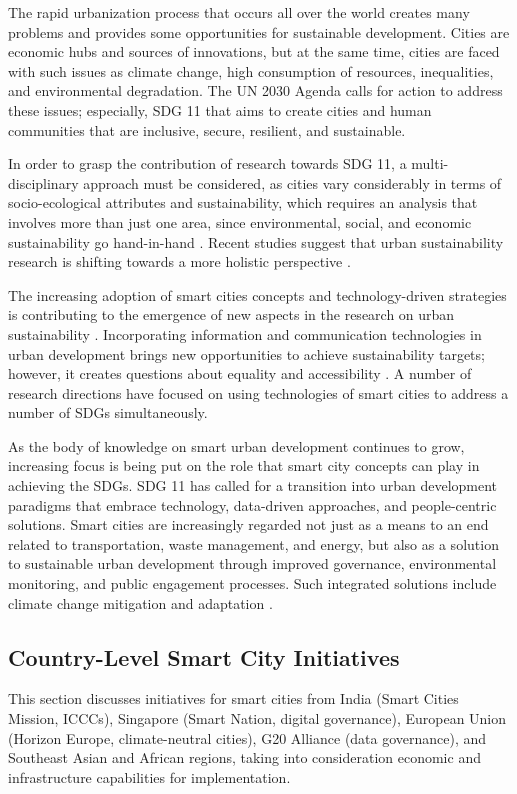\documentclass[pdflatex,sn-mathphys-num]{sn-jnl}%
\theoremstyle{thmstyleone}%
\theoremstyle{thmstyletwo}%
\theoremstyle{thmstylethree}%
\begin{document}
The rapid urbanization process that occurs all over the world creates many problems and provides some opportunities for sustainable development. Cities are economic hubs and sources of innovations, but at the same time, cities are faced with such issues as climate change, high consumption of resources, inequalities, and environmental degradation. The UN 2030 Agenda calls for action to address these issues; especially, SDG 11 that aims to create cities and human communities that are inclusive, secure, resilient, and sustainable. \cite{r114}

In order to grasp the contribution of research towards SDG 11, a multi-disciplinary approach must be considered, as cities vary considerably in terms of socio-ecological attributes and sustainability, which requires an analysis that involves more than just one area, since environmental, social, and economic sustainability go hand-in-hand \cite{r114}. Recent studies suggest that urban sustainability research is shifting towards a more holistic perspective \cite{r115}.

The increasing adoption of smart cities concepts and technology-driven strategies is contributing to the emergence of new aspects in the research on urban sustainability \cite{r116}. Incorporating information and communication technologies in urban development brings new opportunities to achieve sustainability targets; however, it creates questions about equality and accessibility \cite{r117}. A number of research directions have focused on using technologies of smart cities to address a number of SDGs simultaneously.

As the body of knowledge on smart urban development continues to grow, increasing focus is being put on the role that smart city concepts can play in achieving the SDGs. SDG 11 has called for a transition into urban development paradigms that embrace technology, data-driven approaches, and people-centric solutions. Smart cities are increasingly regarded not just as a means to an end related to transportation, waste management, and energy, but also as a solution to sustainable urban development through improved governance, environmental monitoring, and public engagement processes. Such integrated solutions include climate change mitigation and adaptation \cite{r118,r119}.

\subsection{Country-Level Smart City Initiatives}
This section discusses initiatives for smart cities from India (Smart Cities Mission, ICCCs), Singapore (Smart Nation, digital governance), European Union (Horizon Europe, climate-neutral cities), G20 Alliance (data governance), and Southeast Asian and African regions, taking into consideration economic and infrastructure capabilities for implementation.
\end{document}
